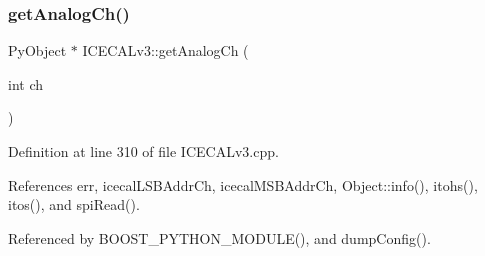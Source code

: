 \subsubsection{\texorpdfstring{get\+Analog\+Ch()}{getAnalogCh()}}
{\footnotesize\ttfamily Py\+Object $\ast$ I\+C\+E\+C\+A\+Lv3\+::get\+Analog\+Ch (\begin{DoxyParamCaption}\item[{int}]{ch }\end{DoxyParamCaption})}



Definition at line 310 of file I\+C\+E\+C\+A\+Lv3.\+cpp.



References err, icecal\+L\+S\+B\+Addr\+Ch, icecal\+M\+S\+B\+Addr\+Ch, Object\+::info(), itohs(), itos(), and spi\+Read().



Referenced by B\+O\+O\+S\+T\+\_\+\+P\+Y\+T\+H\+O\+N\+\_\+\+M\+O\+D\+U\+L\+E(), and dump\+Config().


